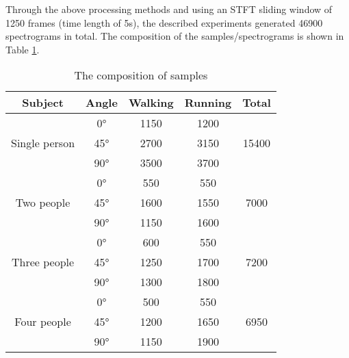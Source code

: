 Through the above processing methods and using an STFT sliding window of 1250 frames (time length of 5s), the described experiments generated 46900 spectrograms in total. The composition of the samples/spectrograms is shown in Table \ref{tb-sample}.
\begin{table}[]
\centering
\caption{The composition of samples}
\label{tb-sample}
\begin{tabular}{|c|c|c|c|c|}
\hline
\textbf{Subject}               & \textbf{Angle} & \textbf{Walking} & \textbf{Running} & \textbf{Total}         \\ \hline
\multirow{3}{*}{Single person} & 0°             & 1150             & 1200             & \multirow{3}{*}{15400} \\ \cline{2-4}
                               & 45°            & 2700             & 3150             &                        \\ \cline{2-4}
                               & 90°            & 3500             & 3700             &                        \\ \hline
\multirow{3}{*}{Two people}    & 0°             & 550              & 550              & \multirow{3}{*}{7000}  \\ \cline{2-4}
                               & 45°            & 1600             & 1550             &                        \\ \cline{2-4}
                               & 90°            & 1150             & 1600             &                        \\ \hline
\multirow{3}{*}{Three people}  & 0°             & 600              & 550              & \multirow{3}{*}{7200}  \\ \cline{2-4}
                               & 45°            & 1250             & 1700             &                        \\ \cline{2-4}
                               & 90°            & 1300             & 1800             &                        \\ \hline
\multirow{3}{*}{Four people}   & 0°             & 500              & 550              & \multirow{3}{*}{6950}  \\ \cline{2-4}
                               & 45°            & 1200             & 1650             &                        \\ \cline{2-4}
                               & 90°            & 1150             & 1900             &                        \\ \hline

\end{tabular}
\end{table}
